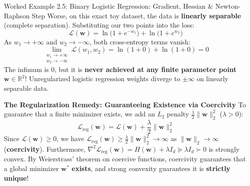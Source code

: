 \begin{examplebox}[breakable]{Worked Example 2.5: Binary Logistic Regression: Gradient, Hessian \& Newton-Raphson Step}
Worse, on this exact toy dataset, the data is \textbf{linearly separable} (complete separation). Substituting our two points into the loss:
\begin{equation*}
\mathcal{L}(\mathbf{w}) = \ln\big(1 + e^{-w_1}\big) + \ln\big(1 + e^{w_2}\big)
\end{equation*}
As $w_1 \to +\infty$ and $w_2 \to -\infty$, both cross-entropy terms vanish:
\begin{equation*}
\lim_{\substack{w_1 \to +\infty \\ w_2 \to -\infty}} \mathcal{L}(w_1, w_2) = \ln(1 + 0) + \ln(1 + 0) = 0
\end{equation*}
The infimum is $0$, but it is \textbf{never achieved at any finite parameter point} $\mathbf{w} \in \mathbb{R}^2$! Unregularized logistic regression weights diverge to $\pm\infty$ on linearly separable data.

\textbf{The Regularization Remedy: Guaranteeing Existence via Coercivity}
To guarantee that a finite minimizer exists, we add an $L_2$ penalty $\frac{\lambda}{2}\|\mathbf{w}\|_2^2$ ($\lambda > 0$):
\begin{equation*}
\mathcal{L}_{\text{reg}}(\mathbf{w}) = \mathcal{L}(\mathbf{w}) + \frac{\lambda}{2}\|\mathbf{w}\|_2^2
\end{equation*}
Since $\mathcal{L}(\mathbf{w}) \ge 0$, we have $\mathcal{L}_{\text{reg}}(\mathbf{w}) \ge \frac{\lambda}{2}\|\mathbf{w}\|_2^2 \to \infty$ as $\|\mathbf{w}\|_2 \to \infty$ (\textbf{coercivity}). Furthermore, $\nabla^2 \mathcal{L}_{\text{reg}}(\mathbf{w}) = H(\mathbf{w}) + \lambda I_d \succeq \lambda I_d \succ 0$ is strongly convex. By Weierstrass' theorem on coercive functions, coercivity guarantees that a global minimizer $\mathbf{w}^*$ \textbf{exists}, and strong convexity guarantees it is \textbf{strictly unique}!


\end{examplebox}
